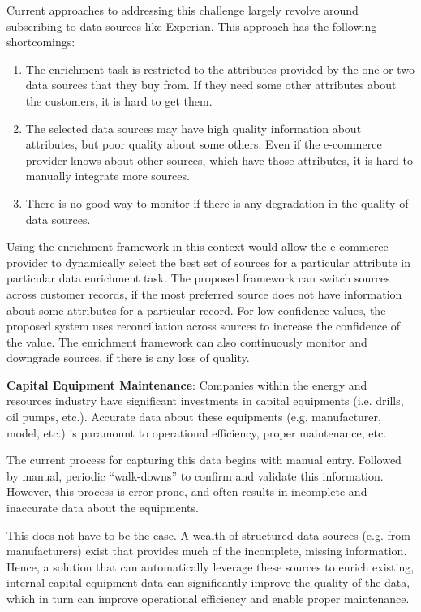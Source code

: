		Current approaches to addressing this challenge largely revolve around subscribing to data sources like Experian. This approach has the following shortcomings:
		\begin{enumerate}
			\item The enrichment task is restricted to the attributes provided by the one or two data sources that they buy from. If they need some other attributes about the customers, it is hard to get them.
			\item The selected data sources may have high quality information about attributes, but poor quality about some others. Even if the e-commerce provider knows about other sources, which have those
				attributes, it is hard to manually integrate more sources.
			\item There is no good way to monitor if there is any degradation in the quality of data sources.
		\end{enumerate}
Using the enrichment framework in this context would allow the e-commerce provider to dynamically select the best set of sources for a particular attribute in  particular data enrichment task. 
The proposed framework can switch sources across customer records, if the most preferred source does not have information about some attributes for a particular record. For low confidence values, the 
proposed system uses reconciliation across sources to increase the confidence of the value. The enrichment framework can also continuously monitor and downgrade sources, if there is any loss of quality.


\textbf{Capital Equipment Maintenance}: Companies within the energy and resources industry have significant investments
in capital equipments (i.e. drills, oil pumps, etc.). Accurate data about these equipments (e.g. manufacturer, model, etc.) 
is paramount to operational efficiency, proper maintenance, etc.

The current process for capturing this data begins with manual entry. Followed by manual, periodic ``walk-downs''
to confirm and validate this information. However, this process is error-prone, and often results in incomplete
and inaccurate data about the equipments.

This does not have to be the case. A wealth of structured data sources (e.g. from manufacturers) exist that
provides much of the incomplete, missing information. Hence, a solution that can automatically leverage these
sources to enrich existing, internal capital equipment data can significantly improve the quality of the data,
which in turn can improve operational efficiency and enable proper maintenance.


